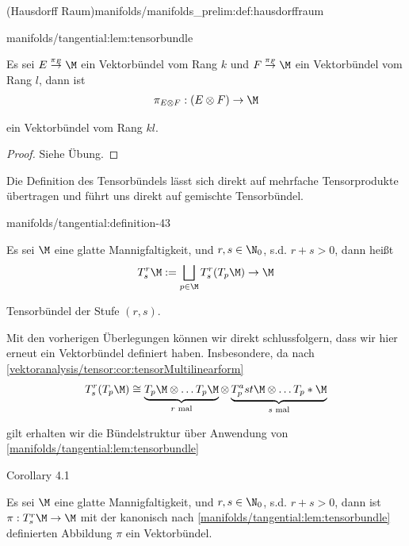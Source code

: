 \documentclass[letterpaper,10pt,english]{jupyterBook}
\begin{document}
\begin{definition}{(Hausdorff Raum)}{manifolds/manifolds_prelim:def:hausdorffraum}
\begin{lemma}{}{manifolds/tangential:lem:tensorbundle}
\par
Es sei \(E\overset{\pi_E}{\to}{\M}\) ein Vektorbündel vom Rang \(k\) und \(F\overset{\pi_F}{\to}{\M}\) ein Vektorbündel vom Rang \(l\), dann ist
\begin{align*}
\pi_{E\otimes F}:(E\otimes F)\to \M
\end{align*}
\par
ein Vektorbündel vom Rang \(kl\).
\end{lemma}

\begin{proof}
 Siehe Übung.
\end{proof}

\par
Die Definition des Tensorbündels lässt sich direkt auf mehrfache Tensorprodukte übertragen und führt uns direkt auf gemischte Tensorbündel.
\begin{definition}{}{manifolds/tangential:definition-43}



\par
Es sei \(\M\) eine glatte Mannigfaltigkeit, und \(r,s\in\N_0\), s.d. \(r+s>0\), dann heißt
\begin{align*}
T^r_s\M := \bigsqcup_{p\in\M} T^r_s(T_p\M) \to \M
\end{align*}
\par
Tensorbündel der Stufe \((r,s)\).
\end{definition}

\par
Mit den vorherigen Überlegungen können wir direkt schlussfolgern, dass wir hier erneut ein Vektorbündel definiert haben. Insbesondere, da nach \cref{vektoranalysis/tensor:cor:tensorMultilinearform} \begin{align*}
T^r_s(T_p\M) \cong \underbrace{T_p\M\otimes\ldots T_p\M}_{r\text{ mal}}\otimes\underbrace{T_p^ast\M\otimes\ldots T_p\ast\M}_{s\text{ mal}}
\end{align*}
\par
gilt erhalten wir die Bündelstruktur über Anwendung von \cref{manifolds/tangential:lem:tensorbundle} 
\label{manifolds/tangential:corollary-44}
\begin{emphBox}{}{}{Corollary 4.1}



\par
Es sei \(\M\) eine glatte Mannigfaltigkeit, und \(r,s\in\N_0\), s.d. \(r+s>0\), dann ist \(\pi:T^r_s\M\to\M\) mit der kanonisch nach \cref{manifolds/tangential:lem:tensorbundle} definierten Abbildung \(\pi\) ein Vektorbündel.
\end{emphBox}


\end{definition}
\end{document}

